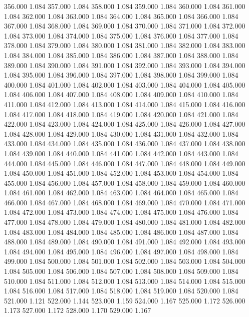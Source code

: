 356.000 1.084 
357.000 1.084 
358.000 1.084 
359.000 1.084 
360.000 1.084 
361.000 1.084 
362.000 1.084 
363.000 1.084 
364.000 1.084 
365.000 1.084 
366.000 1.084 
367.000 1.084 
368.000 1.084 
369.000 1.084 
370.000 1.084 
371.000 1.084 
372.000 1.084 
373.000 1.084 
374.000 1.084 
375.000 1.084 
376.000 1.084 
377.000 1.084 
378.000 1.084 
379.000 1.084 
380.000 1.084 
381.000 1.084 
382.000 1.084 
383.000 1.084 
384.000 1.084 
385.000 1.084 
386.000 1.084 
387.000 1.084 
388.000 1.084 
389.000 1.084 
390.000 1.084 
391.000 1.084 
392.000 1.084 
393.000 1.084 
394.000 1.084 
395.000 1.084 
396.000 1.084 
397.000 1.084 
398.000 1.084 
399.000 1.084 
400.000 1.084 
401.000 1.084 
402.000 1.084 
403.000 1.084 
404.000 1.084 
405.000 1.084 
406.000 1.084 
407.000 1.084 
408.000 1.084 
409.000 1.084 
410.000 1.084 
411.000 1.084 
412.000 1.084 
413.000 1.084 
414.000 1.084 
415.000 1.084 
416.000 1.084 
417.000 1.084 
418.000 1.084 
419.000 1.084 
420.000 1.084 
421.000 1.084 
422.000 1.084 
423.000 1.084 
424.000 1.084 
425.000 1.084 
426.000 1.084 
427.000 1.084 
428.000 1.084 
429.000 1.084 
430.000 1.084 
431.000 1.084 
432.000 1.084 
433.000 1.084 
434.000 1.084 
435.000 1.084 
436.000 1.084 
437.000 1.084 
438.000 1.084 
439.000 1.084 
440.000 1.084 
441.000 1.084 
442.000 1.084 
443.000 1.084 
444.000 1.084 
445.000 1.084 
446.000 1.084 
447.000 1.084 
448.000 1.084 
449.000 1.084 
450.000 1.084 
451.000 1.084 
452.000 1.084 
453.000 1.084 
454.000 1.084 
455.000 1.084 
456.000 1.084 
457.000 1.084 
458.000 1.084 
459.000 1.084 
460.000 1.084 
461.000 1.084 
462.000 1.084 
463.000 1.084 
464.000 1.084 
465.000 1.084 
466.000 1.084 
467.000 1.084 
468.000 1.084 
469.000 1.084 
470.000 1.084 
471.000 1.084 
472.000 1.084 
473.000 1.084 
474.000 1.084 
475.000 1.084 
476.000 1.084 
477.000 1.084 
478.000 1.084 
479.000 1.084 
480.000 1.084 
481.000 1.084 
482.000 1.084 
483.000 1.084 
484.000 1.084 
485.000 1.084 
486.000 1.084 
487.000 1.084 
488.000 1.084 
489.000 1.084 
490.000 1.084 
491.000 1.084 
492.000 1.084 
493.000 1.084 
494.000 1.084 
495.000 1.084 
496.000 1.084 
497.000 1.084 
498.000 1.084 
499.000 1.084 
500.000 1.084 
501.000 1.084 
502.000 1.084 
503.000 1.084 
504.000 1.084 
505.000 1.084 
506.000 1.084 
507.000 1.084 
508.000 1.084 
509.000 1.084 
510.000 1.084 
511.000 1.084 
512.000 1.084 
513.000 1.084 
514.000 1.084 
515.000 1.084 
516.000 1.084 
517.000 1.084 
518.000 1.084 
519.000 1.084 
520.000 1.084 
521.000 1.121 
522.000 1.144 
523.000 1.159 
524.000 1.167 
525.000 1.172 
526.000 1.173 
527.000 1.172 
528.000 1.170 
529.000 1.167 

